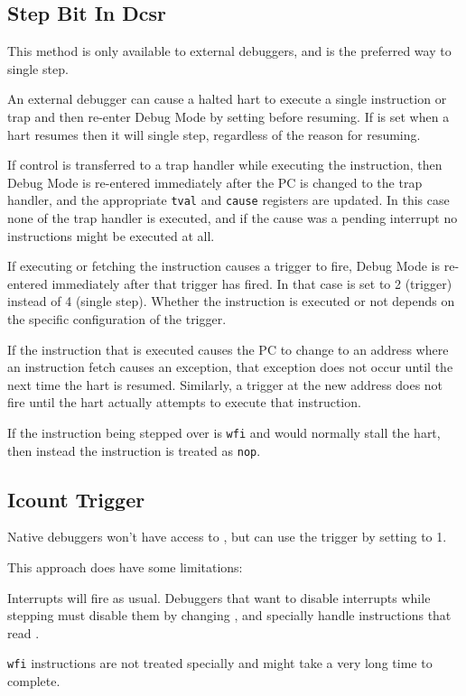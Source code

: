 \subsection{Step Bit In Dcsr} \label{stepBit}

This method is only available to external debuggers, and is the preferred way
to single step.

An external debugger can cause a halted hart to execute a single instruction or
trap and then re-enter Debug Mode by setting \FcsrDcsrStep before resuming.  If
\FcsrDcsrStep is set when a hart resumes then it will single step, regardless
of the reason for resuming.

If control is transferred to a trap handler while executing the instruction,
then Debug Mode is re-entered immediately after the PC is changed to the trap
handler, and the appropriate {\tt tval} and {\tt cause} registers are updated.
In this case none of the trap handler is executed, and if the cause was a
pending interrupt no instructions might be executed at all.

If executing or fetching the instruction causes a trigger to fire, Debug Mode
is re-entered immediately after that trigger has fired. In that case \FcsrDcsrCause is
set to 2 (trigger) instead of 4 (single step).  Whether the instruction is
executed or not depends on the specific configuration of the trigger.

If the instruction that is executed causes the PC to change to an address where
an instruction fetch causes an exception, that exception does not occur until
the next time the hart is resumed. Similarly, a trigger at the new address does
not fire until the hart actually attempts to execute that instruction.

If the instruction being stepped over is {\tt wfi} and would normally stall the
hart, then instead the instruction is treated as {\tt nop}.

\subsection{Icount Trigger}

Native debuggers won't have access to \RcsrDcsr, but can use the \RcsrIcount
trigger by setting \FcsrIcountCount to 1.

\begin{steps}{This approach does have some limitations:}
    \item Interrupts will fire as usual. Debuggers that want to disable
        interrupts while stepping must disable them by changing \Rmstatus, and
        specially handle instructions that read \Rmstatus.
    \item {\tt wfi} instructions are not treated specially and might take a
        very long time to complete.
\end{steps}

